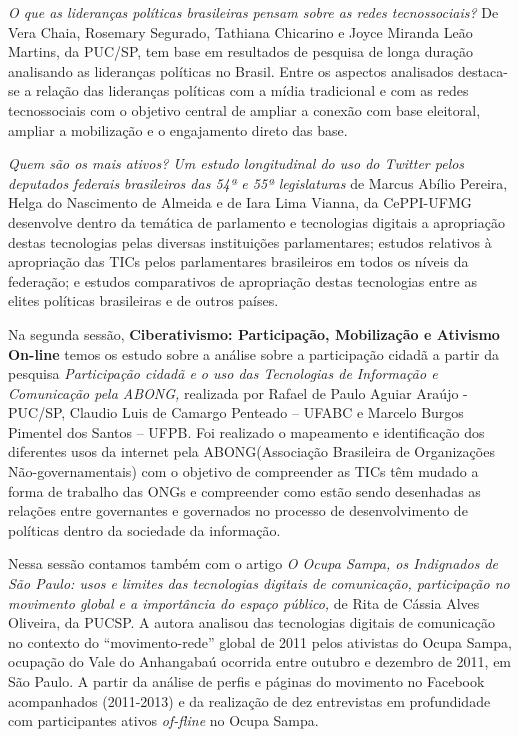 \emph{O que as lideranças políticas brasileiras pensam sobre as redes
tecnossociais?} De Vera Chaia, Rosemary Segurado, Tathiana Chicarino e
Joyce Miranda Leão Martins, da PUC/SP, tem base em resultados de
pesquisa de longa duração analisando as lideranças políticas no Brasil.
Entre os aspectos analisados destaca-se a relação das lideranças
políticas com a mídia tradicional e com as redes tecnossociais com o
objetivo central de ampliar a conexão com base eleitoral, ampliar a
mobilização e o engajamento direto das base.

\emph{Quem são os mais ativos? Um estudo longitudinal do uso do Twitter
pelos deputados federais brasileiros das 54ª e 55ª legislaturas} de
Marcus Abílio Pereira, Helga do Nascimento de Almeida e de Iara Lima
Vianna, da CePPI-UFMG desenvolve dentro da temática de parlamento e
tecnologias digitais a apropriação destas tecnologias pelas diversas
instituições parlamentares; estudos relativos à apropriação das TICs
pelos parlamentares brasileiros em todos os níveis da federação; e
estudos comparativos de apropriação destas tecnologias entre as elites
políticas brasileiras e de outros países.

Na segunda sessão, \textbf{Ciberativismo: Participação, Mobilização e
Ativismo On-line} temos os estudo sobre a análise sobre a participação
cidadã a partir da pesquisa \emph{Participação cidadã e o uso das
Tecnologias de Informação e Comunicação pela ABONG,} realizada por
Rafael de Paulo Aguiar Araújo - PUC/SP, Claudio Luis de Camargo Penteado
-- UFABC e Marcelo Burgos Pimentel dos Santos -- UFPB. Foi realizado o
mapeamento e identificação dos diferentes usos da internet pela
ABONG(Associação Brasileira de Organizações Não-governamentais) com o
objetivo de compreender as TICs têm mudado a forma de trabalho das ONGs
e compreender como estão sendo desenhadas as relações entre governantes
e governados no processo de desenvolvimento de políticas dentro da
sociedade da informação.

Nessa sessão contamos também com o artigo \emph{O Ocupa Sampa, os
Indignados de São Paulo: usos e limites das tecnologias digitais de
comunicação, participação no movimento global e a importância do espaço
público,} de Rita de Cássia Alves Oliveira, da PUCSP. A autora analisou
das tecnologias digitais de comunicação no contexto do
``movimento-rede'' global de 2011 pelos ativistas do Ocupa Sampa,
ocupação do Vale do Anhangabaú ocorrida entre outubro e dezembro de
2011, em São Paulo. A partir da análise de perfis e páginas do movimento
no Facebook acompanhados (2011-2013) e da realização de dez entrevistas
em profundidade com participantes ativos \emph{of-fline} no Ocupa Sampa.

